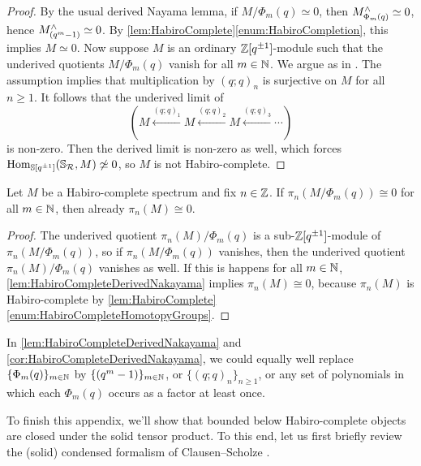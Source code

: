 \documentclass[DIV=12,numbers=enddot,leqno,bibliography=totoc]{scrartcl}
\begin{document}
	\begin{proof}
		By the usual derived Nayama lemma, if $M/\Phi_m(q)\simeq 0$, then $M_{\Phi_m(q)}^\wedge\simeq 0$, hence $M_{(q^m-1)}^\wedge\simeq 0$. By \cref{lem:HabiroComplete}\cref{enum:HabiroCompletion}, this implies $M\simeq 0$. Now suppose $M$ is an ordinary $\mathbb{Z}[q^{\pm 1}]$-module such that the underived quotients $M/\Phi_m(q)$ vanish for all $m\in\mathbb{N}$. We argue as in \cite[]{Stacks}. The assumption implies that multiplication by $(q;q)_n$ is surjective on $M$ for all $n\geqslant 1$. It follows that the underived limit of
		\begin{equation*}
			\left(M\xleftarrow{(q;q)_1}M\xleftarrow{(q;q)_2}M\xleftarrow{(q;q)_3}\dotsb\right)
		\end{equation*}
		is non-zero. Then the derived limit is non-zero as well, which forces $\operatorname{Hom}_{\mathbb{S}[q^{\pm 1}]}(\mathbb{S}_{\mathcal{R}},M)\not\simeq 0$, so $M$ is not Habiro-complete.
	\end{proof}
	\begin{cor}\label{cor:HabiroCompleteDerivedNakayama}
		Let $M$ be a Habiro-complete spectrum and fix $n\in\mathbb{Z}$. If $\pi_n(M/\Phi_m(q))\cong 0$ for all $m\in\mathbb{N}$, then already $\pi_n(M)\cong 0$.
	\end{cor}
	\begin{proof}
		The underived quotient $\pi_n(M)/\Phi_m(q)$ is a sub-$\mathbb{Z}[q^{\pm 1}]$-module of $\pi_n(M/\Phi_m(q))$, so if $\pi_n(M/\Phi_m(q))$ vanishes, then the underived quotient $\pi_n(M)/\Phi_m(q)$ vanishes as well. If this is happens for all $m\in\mathbb{N}$, \cref{lem:HabiroCompleteDerivedNakayama} implies $\pi_n(M)\cong 0$, because $\pi_n(M)$ is Habiro-complete by \cref{lem:HabiroComplete}\cref{enum:HabiroCompleteHomotopyGroups}.
	\end{proof}
	\begin{rem}
		In \cref{lem:HabiroCompleteDerivedNakayama} and \cref{cor:HabiroCompleteDerivedNakayama}, we could equally well replace $\{\Phi_m(q)\}_{m\in\mathbb{N}}$ by $\{(q^m-1)\}_{m\in\mathbb{N}}$, or $\{(q;q)_n\}_{n\geqslant 1}$, or any set of polynomials in which each $\Phi_m(q)$ occurs as a factor at least once.
	\end{rem}
	
	
	To finish this appendix, we'll show that bounded below Habiro-complete objects are closed under the solid tensor product. To this end, let us first briefly review the (solid) condensed formalism of Clausen--Scholze \cite{AnalyticStacks}.
	
\end{document}
